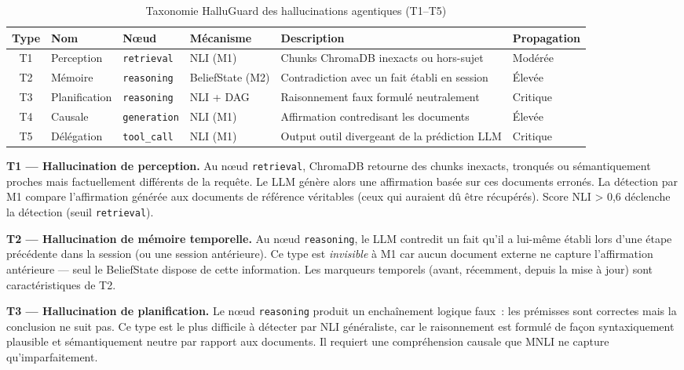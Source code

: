 \documentclass[12pt,a4paper]{article}
\begin{document}
\begin{table}[H]
\centering
\caption{Taxonomie HalluGuard des hallucinations agentiques (T1--T5)}
\label{tab:taxonomy}
\renewcommand{\arraystretch}{1.3}
\begin{tabular}{c l l l p{3.6cm} l}

\toprule
\textbf{Type} & \textbf{Nom} & \textbf{Nœud} & \textbf{Mécanisme} & \textbf{Description} & \textbf{Propagation} \\
\midrule
T1 & Perception & \texttt{retrieval} & NLI (M1) & Chunks ChromaDB inexacts ou hors-sujet & Modérée \\
T2 & Mémoire & \texttt{reasoning} & BeliefState (M2) & Contradiction avec un fait établi en session & Élevée \\
T3 & Planification & \texttt{reasoning} & NLI + DAG & Raisonnement faux formulé neutralement & Critique \\
T4 & Causale & \texttt{generation} & NLI (M1) & Affirmation contredisant les documents & Élevée \\
T5 & Délégation & \texttt{tool\_call} & NLI (M1) & Output outil divergeant de la prédiction LLM & Critique \\
\bottomrule
\end{tabular}
\end{table}

\textbf{T1 --- Hallucination de perception.}
Au nœud \texttt{retrieval}, ChromaDB retourne des chunks inexacts, tronqués ou sémantiquement proches mais factuellement différents de la requête. Le LLM génère alors une affirmation basée sur ces documents erronés. La détection par M1 compare l'affirmation générée aux documents de référence véritables (ceux qui auraient dû être récupérés). Score NLI > 0,6 déclenche la détection (seuil \texttt{retrieval}).

\textbf{T2 --- Hallucination de mémoire temporelle.}
Au nœud \texttt{reasoning}, le LLM contredit un fait qu'il a lui-même établi lors d'une étape précédente dans la session (ou une session antérieure). Ce type est \textit{invisible} à M1 car aucun document externe ne capture l'affirmation antérieure --- seul le BeliefState dispose de cette information. Les marqueurs temporels (\og{}avant\fg{}, \og{}récemment\fg{}, \og{}depuis la mise à jour\fg{}) sont caractéristiques de T2.

\textbf{T3 --- Hallucination de planification.}
Le nœud \texttt{reasoning} produit un enchaînement logique faux~: les prémisses sont correctes mais la conclusion ne suit pas. Ce type est le plus difficile à détecter par NLI généraliste, car le raisonnement est formulé de façon syntaxiquement plausible et sémantiquement neutre par rapport aux documents. Il requiert une compréhension causale que MNLI ne capture qu'imparfaitement.
\end{document}
